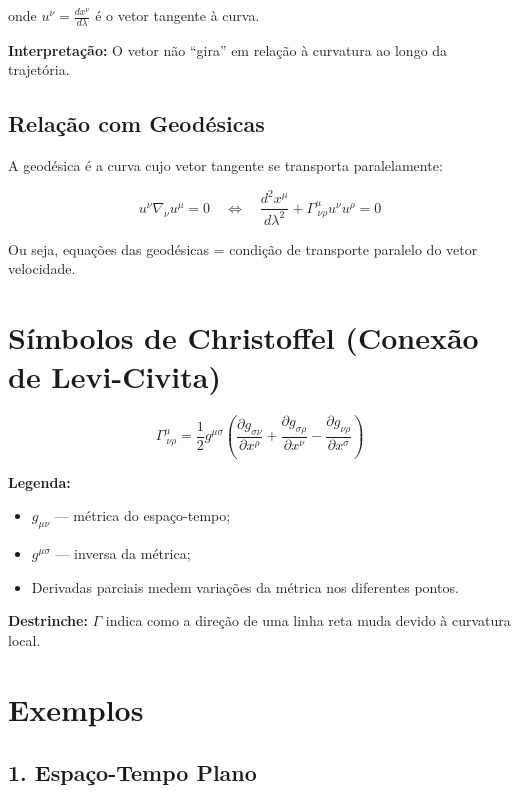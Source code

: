 \documentclass[a4paper,12pt]{article}
\begin{document}
onde \(u^\nu = \frac{dx^\nu}{d\lambda}\) é o vetor tangente à curva.  

\textbf{Interpretação:}  
O vetor não “gira” em relação à curvatura ao longo da trajetória.

\subsection*{Relação com Geodésicas}

A geodésica é a curva cujo vetor tangente se transporta paralelamente:

\[
u^\nu \nabla_\nu u^\mu = 0 \quad \Leftrightarrow \quad \frac{d^2 x^\mu}{d\lambda^2} + \Gamma^{\mu}_{\ \nu\rho} u^\nu u^\rho = 0
\]

Ou seja, equações das geodésicas = condição de transporte paralelo do vetor velocidade.

\section*{Símbolos de Christoffel (Conexão de Levi-Civita)}

\begin{equation}
\Gamma^{\mu}_{\ \nu\rho} = \frac{1}{2} g^{\mu\sigma}
\left( \frac{\partial g_{\sigma\nu}}{\partial x^\rho} +
       \frac{\partial g_{\sigma\rho}}{\partial x^\nu} -
       \frac{\partial g_{\nu\rho}}{\partial x^\sigma} \right)
\end{equation}

\textbf{Legenda:}
\begin{itemize}
    \item $g_{\mu\nu}$ — métrica do espaço-tempo;
    \item $g^{\mu\sigma}$ — inversa da métrica;
    \item Derivadas parciais medem variações da métrica nos diferentes pontos.
\end{itemize}

\textbf{Destrinche:}  
\(\Gamma\) indica como a direção de uma linha reta muda devido à curvatura local.

\section*{Exemplos}

\subsection*{1. Espaço-Tempo Plano}
\end{document}

